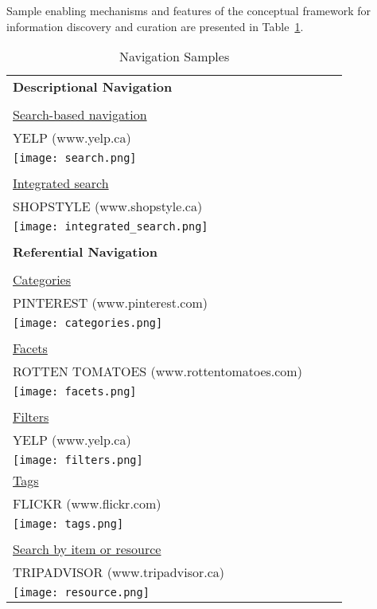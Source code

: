 \label{chapter:appendix_features}

Sample enabling mechanisms and features of the conceptual framework for information discovery and curation are presented in Table~\ref{table:features}.
\begin{longtable}{|p{0.90\linewidth}|}
\caption{Navigation Samples}\label{table:features}\\
\hline
\textbf{Descriptional Navigation} 		\\	
\\
\underline{Search-based navigation}	\\	
YELP (www.yelp.ca)\\	
\texttt{[image: search.png]}\\
\\
\underline{Integrated search}				\\
SHOPSTYLE (www.shopstyle.ca)\\
\texttt{[image: integrated\_search.png]}\\
\\
\hline
\pagebreak
\hline
\textbf{Referential Navigation}       		\\
\\
\underline{Categories}		\\	
PINTEREST (www.pinterest.com)	\\ 		
\texttt{[image: categories.png]}\\
\\
\underline{Facets}				    		\\
ROTTEN TOMATOES (www.rottentomatoes.com)\\
\texttt{[image: facets.png]}\\
\\
\hline
\pagebreak
\hline
\underline{Filters}					  		\\
YELP (www.yelp.ca)\\
\texttt{[image: filters.png]}\\

\underline{Tags}\\
FLICKR (www.flickr.com)				      		\\
\texttt{[image: tags.png]}\\
\\
\underline{Search by item or resource}		\\
TRIPADVISOR (www.tripadvisor.ca)\\
\texttt{[image: resource.png]}\\


\end{longtable}
